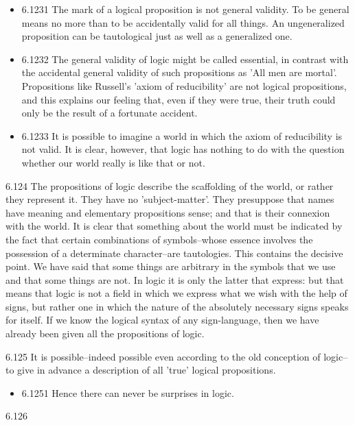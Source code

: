 \documentclass[11pt]{article}
\begin{document}
\begin{itemize}
\item 6.1231
\label{sec:orga75b9e8}
The mark of a logical proposition is not general validity. To be
general means no more than to be accidentally valid for all things. An
ungeneralized proposition can be tautological just as well as a generalized
one.
\item 6.1232
\label{sec:org6fdda24}
The general validity of logic might be called essential, in contrast
with the accidental general validity of such propositions as 'All men are
mortal'. Propositions like Russell's 'axiom of reducibility' are not
logical propositions, and this explains our feeling that, even if they were
true, their truth could only be the result of a fortunate accident.
\item 6.1233
\label{sec:org92367de}
It is possible to imagine a world in which the axiom of reducibility
is not valid. It is clear, however, that logic has nothing to do with the
question whether our world really is like that or not.
\end{itemize}
\item 6.124
\label{sec:orga2e41d5}
The propositions of logic describe the scaffolding of the world, or
rather they represent it. They have no 'subject-matter'. They presuppose
that names have meaning and elementary propositions sense; and that is
their connexion with the world. It is clear that something about the world
must be indicated by the fact that certain combinations of symbols--whose
essence involves the possession of a determinate character--are
tautologies. This contains the decisive point. We have said that some
things are arbitrary in the symbols that we use and that some things are
not. In logic it is only the latter that express: but that means that logic
is not a field in which we express what we wish with the help of signs, but
rather one in which the nature of the absolutely necessary signs speaks for
itself. If we know the logical syntax of any sign-language, then we have
already been given all the propositions of logic.
\item 6.125
\label{sec:org6d706b9}
It is possible--indeed possible even according to the old conception
of logic--to give in advance a description of all 'true' logical
propositions.
\begin{itemize}
\item 6.1251
\label{sec:org18a625a}
Hence there can never be surprises in logic.
\end{itemize}
\item 6.126
\end{document}
